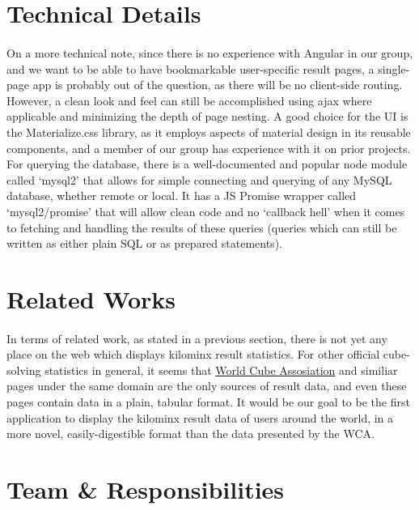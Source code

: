 \documentclass[12pt]{article}
\begin{document}
	\section{Technical Details}
		\paragraph*{}
			On a more technical note, since there is no experience with Angular in our group, and we want to be able to have bookmarkable user-specific result pages, a single-page app is probably out of the question, as there will be no client-side routing. However, a clean look and feel can still be accomplished using ajax where applicable and minimizing the depth of page nesting. A good choice for the UI is the Materialize.css library, as it employs aspects of material design in its reusable components, and a member of our group has experience with it on prior projects. For querying the database, there is a well-documented and popular node module called ‘mysql2’ that allows for simple connecting and querying of any MySQL database, whether remote or local. It has a JS Promise wrapper called ‘mysql2/promise’ that will allow clean code and no ‘callback hell’ when it comes to fetching and handling the results of these queries (queries which can still be written as either plain SQL or as prepared statements). 

	\section{Related Works}
		\paragraph*{}
			In terms of related work, as stated in a previous section, there is not yet any place on the web which displays kilominx result statistics. For other official cube-solving statistics in general, it seems that \href{https://www.worldcubeassociation.org/results/statistics.php}{World Cube Assosiation} and similiar pages under the same domain are the only sources of result data, and even these pages contain data in a plain, tabular format. It would be our goal to be the first application to display the kilominx result data of users around the world, in a more novel, easily-digestible format than the data presented by the WCA.

	\section{Team \& Responsibilities}
\end{document}
